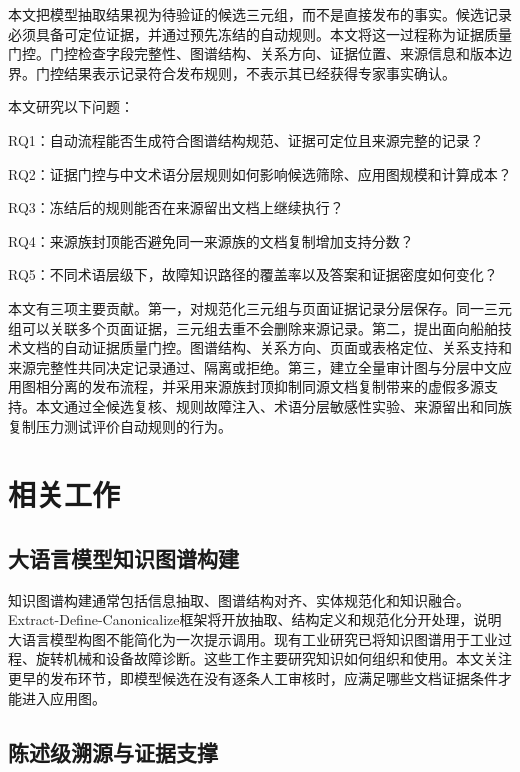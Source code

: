 \documentclass[conference,a4paper]{IEEEtran}
\begin{document}
本文把模型抽取结果视为待验证的候选三元组，而不是直接发布的事实。候选记录必须具备可定位证据，并通过预先冻结的自动规则。本文将这一过程称为证据质量门控。门控检查字段完整性、图谱结构、关系方向、证据位置、来源信息和版本边界。门控结果表示记录符合发布规则，不表示其已经获得专家事实确认。

本文研究以下问题：

\noindent RQ1：自动流程能否生成符合图谱结构规范、证据可定位且来源完整的记录？

\noindent RQ2：证据门控与中文术语分层规则如何影响候选筛除、应用图规模和计算成本？

\noindent RQ3：冻结后的规则能否在来源留出文档上继续执行？

\noindent RQ4：来源族封顶能否避免同一来源族的文档复制增加支持分数？

\noindent RQ5：不同术语层级下，故障知识路径的覆盖率以及答案和证据密度如何变化？

本文有三项主要贡献。第一，对规范化三元组与页面证据记录分层保存。同一三元组可以关联多个页面证据，三元组去重不会删除来源记录。第二，提出面向船舶技术文档的自动证据质量门控。图谱结构、关系方向、页面或表格定位、关系支持和来源完整性共同决定记录通过、隔离或拒绝。第三，建立全量审计图与分层中文应用图相分离的发布流程，并采用来源族封顶抑制同源文档复制带来的虚假多源支持。本文通过全候选复核、规则故障注入、术语分层敏感性实验、来源留出和同族复制压力测试评价自动规则的行为。

\section{相关工作}

\subsection{大语言模型知识图谱构建}

知识图谱构建通常包括信息抽取、图谱结构对齐、实体规范化和知识融合\cite{Hogan2021,Ji2022}。Extract-Define-Canonicalize框架将开放抽取、结构定义和规范化分开处理，说明大语言模型构图不能简化为一次提示调用\cite{Zhang2024EDC}。现有工业研究已将知识图谱用于工业过程、旋转机械和设备故障诊断\cite{Han2022,Cai2024,Wu2024}。这些工作主要研究知识如何组织和使用。本文关注更早的发布环节，即模型候选在没有逐条人工审核时，应满足哪些文档证据条件才能进入应用图。

\subsection{陈述级溯源与证据支撑}
\end{document}
